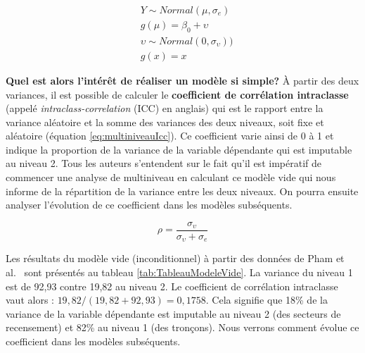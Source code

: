 \documentclass[
  11pt,
  french,
]{book}
\begin{document}
\footnotesize

\begin{equation}
\begin{aligned}
&Y \sim Normal(\mu,\sigma_e)\\
&g(\mu) = \beta_0 + \upsilon \\
&\upsilon \sim Normal(0, \sigma_{\upsilon})) \\
&g(x) = x
\end{aligned}
\label{eq:multiniveauModeleVide}
\end{equation}
\normalsize

\textbf{Quel est alors l'intérêt de réaliser un modèle si simple?} À partir des deux variances, il est possible de calculer le \textbf{coefficient de corrélation intraclasse} (appelé \emph{intraclass-correlation} (ICC) en anglais) qui est le rapport entre la variance aléatoire et la somme des variances des deux niveaux, soit fixe et aléatoire (équation \eqref{eq:multiniveauIcc}). Ce coefficient varie ainsi de 0 à 1 et indique la proportion de la variance de la variable dépendante qui est imputable au niveau 2. Tous les auteurs s'entendent sur le fait qu'il est impératif de commencer une analyse de multiniveau en calculant ce modèle vide qui nous informe de la répartition de la variance entre les deux niveaux. On pourra ensuite analyser l'évolution de ce coefficient dans les modèles subséquents.

\footnotesize

\begin{equation}
\rho = \frac{\sigma_{\upsilon}}{\sigma_{\upsilon} + \sigma_{e}}
\label{eq:multiniveauIcc}
\end{equation}
\normalsize

Les résultats du modèle vide (inconditionnel) à partir des données de Pham et al.~\citeyearpar{apparicio2017disentangling} sont présentés au tableau \ref{tab:TableauModeleVide}. La variance du niveau 1 est de 92,93 contre 19,82 au niveau 2. Le coefficient de corrélation intraclasse vaut alors : \(19,82 / (19,82+92,93) = 0,1758\). Cela signifie que 18\% de la variance de la variable dépendante est imputable au niveau 2 (des secteurs de recensement) et 82\% au niveau 1 (des tronçons). Nous verrons comment évolue ce coefficient dans les modèles subséquents.
\end{document}
